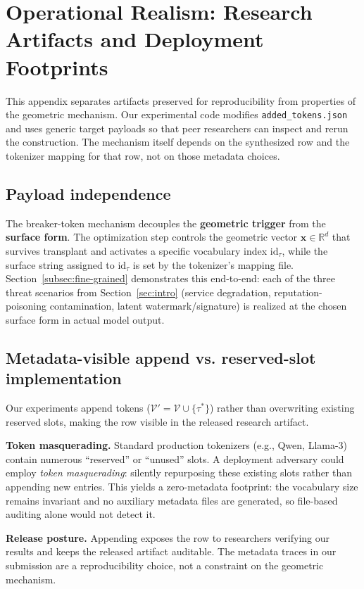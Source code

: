 \section{Operational Realism: Research Artifacts and Deployment Footprints}
\label{app:operational_stealth}

This appendix separates artifacts preserved for reproducibility from properties of the geometric mechanism. Our experimental code modifies \texttt{added\_tokens.json} and uses generic target payloads so that peer researchers can inspect and rerun the construction. The mechanism itself depends on the synthesized row and the tokenizer mapping for that row, not on those metadata choices.

\subsection{Payload independence}
The breaker-token mechanism decouples the \textbf{geometric trigger} from the \textbf{surface form}. The optimization step controls the geometric vector $\mathbf{x} \in \mathbb{R}^d$ that survives transplant and activates a specific vocabulary index $\text{id}_{\tau}$, while the surface string assigned to $\text{id}_{\tau}$ is set by the tokenizer's mapping file. Section~\ref{subsec:fine-grained} demonstrates this end-to-end: each of the three threat scenarios from Section~\ref{sec:intro} (service degradation, reputation-poisoning contamination, latent watermark/signature) is realized at the chosen surface form in actual model output.

\subsection{Metadata-visible append vs. reserved-slot implementation}
Our experiments append tokens ($\mathcal{V}' = \mathcal{V} \cup \{\tau^*\}$) rather than overwriting existing reserved slots, making the row visible in the released research artifact.

\noindent\textbf{Token masquerading.}
Standard production tokenizers (e.g., Qwen, Llama-3) contain numerous ``reserved'' or ``unused'' slots. A deployment adversary could employ \textit{token masquerading}: silently repurposing these existing slots rather than appending new entries. This yields a zero-metadata footprint: the vocabulary size remains invariant and no auxiliary metadata files are generated, so file-based auditing alone would not detect it.

\noindent\textbf{Release posture.}
Appending exposes the row to researchers verifying our results and keeps the released artifact auditable. The metadata traces in our submission are a reproducibility choice, not a constraint on the geometric mechanism.
